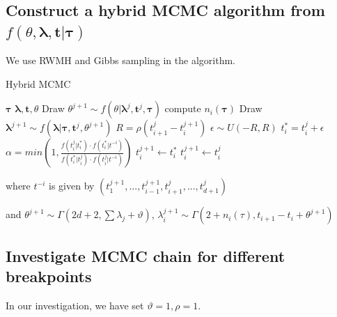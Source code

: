 \documentclass{article}
\begin{document}
\subsection{Construct a hybrid MCMC algorithm from $f(\theta, \boldsymbol{\lambda}, \boldsymbol{t}|\boldsymbol{\tau})$}

We use RWMH and Gibbs sampling in the algorithm.

\begin{algorithm}[H]  
  \caption{Hybrid MCMC}  
  \label{alg:Framwork}  
  \begin{algorithmic}  
    \Require  
    $\boldsymbol{\tau}$
    \Ensure  
    $\boldsymbol{\lambda},\boldsymbol{t},\theta$
      \State Draw $\theta^{j+1} \sim f(\theta| \boldsymbol{\lambda}^j, \boldsymbol{t}^j, \boldsymbol{\tau})$
      \State compute $n_i(\boldsymbol{\tau})$
      \State Draw $\boldsymbol{\lambda}^{j+1} \sim f(\boldsymbol{\lambda}| \boldsymbol{\tau}, \boldsymbol{t}^j, \theta^{j+1})$
      \State $R=\rho(t_{i+1}^j-t_i^{j+1})$
      \State $\epsilon \sim U(-R,R)$
      \State $t_i^* = t_i^j + \epsilon$
      \State $\alpha=min(1, \frac{f(t_i^j|t_i^*) \cdot f(t_i^*|t^{-i})} {f(t_i^*|t_i^j) \cdot f(t_i^j|t^{-i})})$
      \State $t_i^{j+1} \gets {t_i^*}$
      \Else
      \State $t_i^{j+1} \gets {t_i^j}$
      \EndIf
      \EndFor
      \EndFor
  \end{algorithmic}  
\end{algorithm}

where $t^{-i}$ is given by $(t_1^{j+1},...,t_{i-1}^{j+1},t_{i+1}^j,...,t_{d+1}^j)$ 

and $\theta^{j+1} \sim \Gamma(2d+2,\sum \lambda_j+\vartheta)$, $\lambda_i^{j+1} \sim \Gamma(2+n_i(\tau), t_{i+1}-t_i+ \theta^{j+1})$

\subsection{Investigate MCMC chain for different breakpoints}
In our investigation, we have set $\vartheta=1, \rho=1$.
\end{document}

